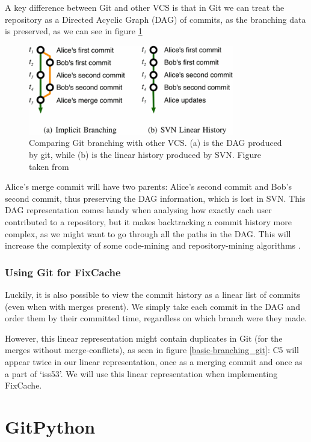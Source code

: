 \documentclass[12pt,twoside,notitlepage]{report}
\newcommand{\fxch}{FixCache}
\begin{document}
A key difference between Git and other VCS is that in Git we can treat the repository as a Directed Acyclic Graph (DAG) of commits, as the branching data is preserved, as we can see in figure \ref{branching}
\begin{figure}[h]
\includegraphics[width=0.8\textwidth]{branching.png}
\centering

\captionsetup{width=0.8\textwidth}
\caption[Comparing Git branching with other VCS]{Comparing Git branching with other VCS. (a) is the DAG produced by git, while (b) is the linear history produced by SVN. Figure taken from \cite{Git}}
\label{branching}
\end{figure}

Alice's merge commit will have two parents: Alice's second commit and Bob's second commit, thus preserving the DAG information, which is lost in SVN. This DAG representation comes handy when analysing how exactly each user contributed to a repository, but it makes backtracking a commit history more complex, as we might want to go through all the paths in the DAG. This will increase the complexity of some code-mining and repository-mining algorithms \cite{Git}.


\subsubsection{Using Git for \fxch{}}
Luckily, it is also possible to view the commit history as a linear list of commits (even when with merges present). We simply take each commit in the DAG and order them by their committed time, regardless on which branch were they made.

However, this linear representation might contain duplicates in Git (for the merges without merge-conflicts), as seen in figure \ref{basic-branching_git}:  C5 will appear twice in our linear representation, once as a merging commit and once as a part of `iss53'. We will use this linear representation when implementing \fxch{}.
\section{GitPython}
\end{document}
